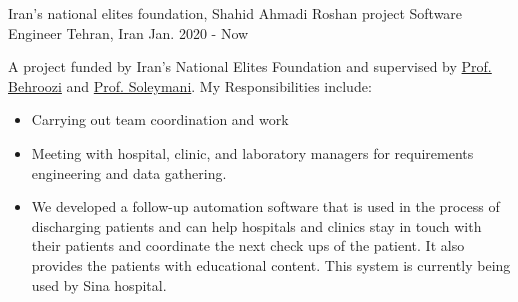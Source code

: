 

\begin{cventries}

  \cventry
  {Iran's national elites foundation, Shahid Ahmadi Roshan project} %
  {Software Engineer} %
  {Tehran, Iran} %
  {Jan. 2020 - Now} %
  {
   A project funded by Iran's National Elites Foundation and supervised by \textcolor{awesome-red}{\href{http://ee.sharif.edu/~behroozi/}{Prof. Behroozi}} and \textcolor{awesome-red}{\href{http://sharif.edu/~soleymani/}{Prof. Soleymani}}.
   My Responsibilities include:
   \begin{itemize}
          \item
       Carrying out team coordination and work
       \item 
       Meeting with hospital, clinic, and laboratory managers for requirements engineering and data gathering.
       \item
      We developed a follow-up automation software that is used in the process of discharging patients and can help hospitals and clinics stay in touch with their patients and coordinate the next check ups of the patient. It also provides the patients with educational content. This system is currently being used by Sina hospital.
   \end{itemize}
  }


\end{cventries}
